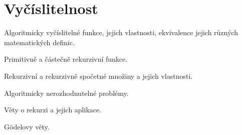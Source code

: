 \newpage
\section{Vyčíslitelnost}
\begin{pozadavky}
\begin{pitemize}
\item Algoritmicky vyčíslitelné funkce, jejich vlastnosti, ekvivalence jejich různých matematických definic.
\item Primitivně a částečně rekurzivní funkce. 
\item Rekurzivní a rekurzivně spočetné množiny a jejich vlastnosti.
\item Algoritmicky nerozhodnutelné problémy.
\item Věty o rekurzi a jejich aplikace.
\item Gödelovy věty.
\end{pitemize}
\end{pozadavky}





